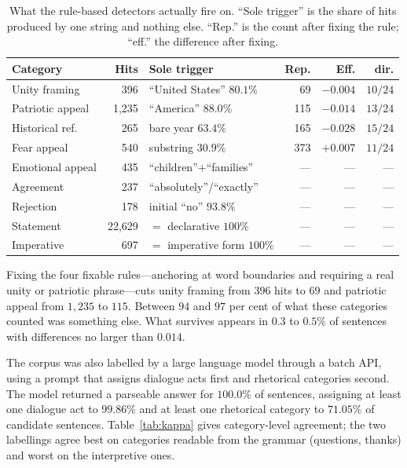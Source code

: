 \documentclass[journal]{IEEEtran}
\begin{document}
\begin{table}[h]
\caption{What the rule-based detectors actually fire on. ``Sole trigger'' is
the share of hits produced by one string and nothing else. ``Rep.'' is the
count after fixing the rule; ``eff.'' the difference after fixing.}
\label{tab:regex}
\centering
\footnotesize
\setlength{\tabcolsep}{2pt}
\begin{tabular}{lrlrrr}
\toprule
Category & Hits & Sole trigger & Rep. & Eff. & dir. \\
\midrule
Unity framing     & 396   & ``United States'' $80.1\%$ & 69  & $-0.004$ & $10/24$ \\
Patriotic appeal  & 1{,}235 & ``America'' $88.0\%$     & 115 & $-0.014$ & $13/24$ \\
Historical ref.   & 265   & bare year $63.4\%$         & 165 & $-0.028$ & $15/24$ \\
Fear appeal       & 540   & substring $30.9\%$         & 373 & $+0.007$ & $11/24$ \\
Emotional appeal  & 435   & ``children''$+$``families'' & --- & --- & --- \\
Agreement         & 237   & ``absolutely''/``exactly'' & --- & --- & --- \\
Rejection         & 178   & initial ``no'' $93.8\%$    & --- & --- & --- \\
Statement         & 22{,}629 & $=$ declarative $100\%$ & --- & --- & --- \\
Imperative        & 697 & $=$ imperative form $100\%$  & --- & --- & --- \\
\bottomrule
\end{tabular}
\end{table}

Fixing the four fixable rules---anchoring at word boundaries and requiring a
real unity or patriotic phrase---cuts unity framing from $396$ hits to $69$
and patriotic appeal from $1{,}235$ to $115$. Between $94$ and $97$ per cent
of what these categories counted was something else. What survives appears
in $0.3$ to $0.5\%$ of sentences with differences no larger than $0.014$.

The corpus was also labelled by a large language model through a batch API,
using a prompt that assigns dialogue acts first and rhetorical categories
second. The model returned a parseable answer for $100.0\%$ of sentences,
assigning at least one dialogue act to $99.86\%$ and at least one rhetorical
category to $71.05\%$ of candidate sentences. Table~\ref{tab:kappa} gives
category-level agreement; the two labellings agree best on categories
readable from the grammar (questions, thanks) and worst on the interpretive
ones.
\end{document}
